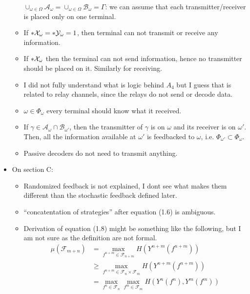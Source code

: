 \documentclass{article}
\begin{document}
\begin{itemize}
\begin{itemize}
		            \(\cup_{\omega \in \Omega} \mathcal{A}_{\omega} = \cup_{\omega \in \Omega } \mathcal{B}_{\omega} = \Gamma\): we can assume that each transmitter/receiver is placed only on one terminal.
		      \item If \(\abs{\mathcal{X}_{\omega}} = \abs{\mathcal{Y}_{\omega}} = 1\), then terminal can not transmit or receive any information.
		      \item If \(\abs{\mathcal{X}_{\omega}}\) then the terminal can not send information, hence no transmitter should be placed on it. Similarly for receiving.
		      \item I did not fully understand what is logic behind \(A_4\) but I guess that is related to relay channels, since the relays do not send or decode data.
		      \item \(\omega \in \Phi_{\omega}\) every terminal should know what it received.
		      \item If \(\gamma \in \mathcal{A}_{\omega} \cap \mathcal{B}_{\omega'}\), then the transmitter of \(\gamma\) is on \(\omega\) and its receiver is on \(\omega'\). Then, all the information available at \(\omega'\) is feedbacked to \(\omega\), i.e. \(\Phi_{\omega'} \subset \Phi_{\omega}\).
		      \item Passive decoders do not need to transmit anything.
	      \end{itemize}
	\item On section C:
	      \begin{itemize}
		      \item Randomized feedback is not explained, I dont see what makes them different than the stochastic feedback defined later.
		      \item ``concatentation of strategies'' after equation (1.6) is ambiguous.
		      \item Derivation of equation (1.8) might be something like the following, but I am not sure as the definition are not formal.
		            \begin{align*}
			            \mu(\mathcal{F}_{m + n}) & = \max_{f^{n + m} \in \mathcal{F}_{n + m}} H(Y^{n + m}(f^{n+ m}))                              \\
			                                     & \geq  \max_{f^{n + m} \in \mathcal{F}_n \times \mathcal{F}_m } H(Y^{n + m}(f^{n+ m}))          \\
			                                     & = \max_{f^{n} \in \mathcal{F}_n} \max_{f^m \in \mathcal{F}_m } H(Y^{n }(f^{n}) , Y^m(f^m))     \\

\end{align*}
\end{itemize}
\end{itemize}
\end{document}
